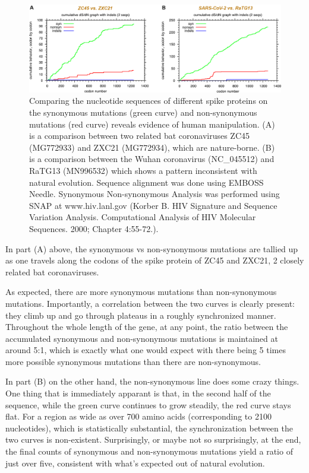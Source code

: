 \documentclass[11pt]{article}
\begin{document}
\begin{figure}[htbp]
\centering
\includegraphics[width=.9\linewidth]{./images/syn-vs-nonsyn.png}
\caption{Comparing the nucleotide sequences of different spike proteins on the synonymous mutations (green curve) and non-synonymous mutations (red curve) reveals evidence of human manipulation. (A) is a comparison between two related bat coronaviruses ZC45 (MG772933) and ZXC21 (MG772934), which are nature-borne. (B) is a comparison between the Wuhan coronavirus (NC\_045512) and RaTG13 (MN996532) which shows a pattern inconsistent with natural evolution. Sequence alignment was done using EMBOSS Needle. Synonymous Non-synonymous Analysis was performed using SNAP at www.hiv.lanl.gov (Korber B. HIV Signature and Sequence Variation Analysis. Computational Analysis of HIV Molecular Sequences. 2000; Chapter 4:55-72.).}
\end{figure}

In part (A) above, the synonymous vs non-synonymous mutations are tallied up as one travels along the codons of the spike protein of ZC45 and ZXC21, 2 closely related bat coronaviruses.

As expected, there are more synonymous mutations than non-synonymous mutations. Importantly, a correlation between the two curves is clearly present: they climb up and go through plateaus in a roughly synchronized manner. Throughout the whole length of the gene, at any point, the ratio between the accumulated synonymous and non-synonymous mutations is maintained at around 5:1, which is exactly what one would expect with there being 5 times more possible synonymous mutations than there are non-synonymous.

In part (B) on the other hand, the non-synonymous line does some crazy things. One thing that is immediately apparant is that, in the second half of the sequence, while the green curve continues to grow steadily, the red curve stays flat. For a region as wide as over 700 amino acids (corresponding to 2100 nucleotides), which is statistically substantial, the synchronization between the two curves is non-existent. Surprisingly, or maybe not so surprisingly, at the end, the final counts of synonymous and non-synonymous mutations yield a ratio of just over five, consistent with what’s expected out of natural evolution.
\end{document}
